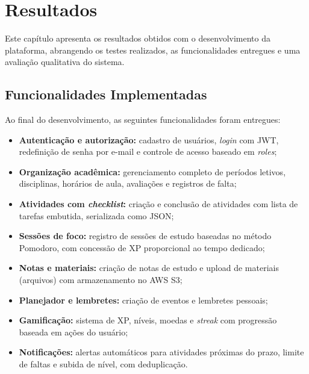 
\chapter{Resultados}
\label{cap:resultados}

Este capítulo apresenta os resultados obtidos com o desenvolvimento da plataforma,
abrangendo os testes realizados, as funcionalidades entregues e uma avaliação
qualitativa do sistema.

\section{Funcionalidades Implementadas}
\label{sec:funcionalidades}

Ao final do desenvolvimento, as seguintes funcionalidades foram entregues:

\begin{itemize}
  \item \textbf{Autenticação e autorização:} cadastro de usuários, \textit{login}
        com JWT, redefinição de senha por e-mail e controle de acesso baseado em
        \textit{roles};

  \item \textbf{Organização acadêmica:} gerenciamento completo de períodos letivos,
        disciplinas, horários de aula, avaliações e registros de falta;

  \item \textbf{Atividades com \textit{checklist}:} criação e conclusão de
        atividades com lista de tarefas embutida, serializada como JSON;

  \item \textbf{Sessões de foco:} registro de sessões de estudo baseadas no método
        Pomodoro, com concessão de XP proporcional ao tempo dedicado;

  \item \textbf{Notas e materiais:} criação de notas de estudo e upload de
        materiais (arquivos) com armazenamento no AWS S3;

  \item \textbf{Planejador e lembretes:} criação de eventos e lembretes pessoais;

  \item \textbf{Gamificação:} sistema de XP, níveis, moedas e \textit{streak} com
        progressão baseada em ações do usuário;

  \item \textbf{Notificações:} alertas automáticos para atividades próximas do
        prazo, limite de faltas e subida de nível, com deduplicação.
\end{itemize}

